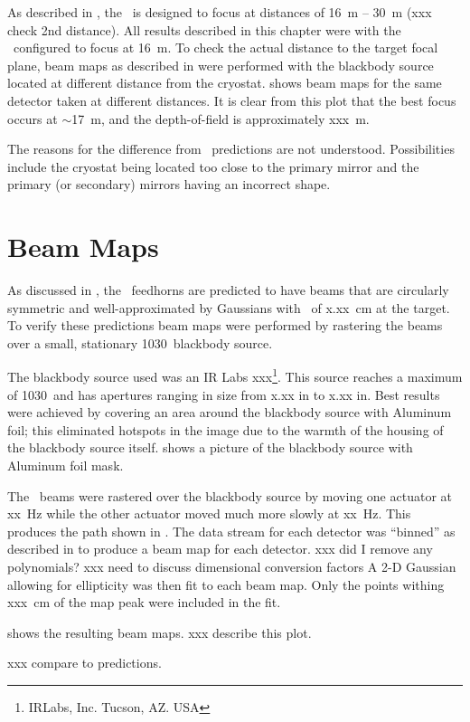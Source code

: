 As described in , the \Imager\ is designed to focus at distances of 16~m -- 30~m (xxx check 2nd distance).
All results described in this chapter were with the \Imager\ configured to focus at 16~m.
To check the actual distance to the target focal plane, beam maps as described in  were performed with the blackbody source located at different distance from the cryostat.
 shows beam maps for the same detector taken at different distances.
It is clear from this plot that the best focus occurs at $\sim$17~m, and the depth-of-field is approximately xxx~m.

The reasons for the difference from \ZEMAX\ predictions are not understood.
Possibilities include the cryostat being located too close to the primary mirror and the primary (or secondary) mirrors having an incorrect shape.

\section{Beam Maps}

As discussed in , the \Imager\ feedhorns are predicted to have beams that are circularly symmetric and well-approximated by Gaussians with \FWHM\ of x.xx~cm at the target.
To verify these predictions beam maps were performed by rastering the beams over a small, stationary 1030~\degC blackbody source.

The blackbody source used was an IR Labs xxx\footnote{IRLabs, Inc. Tucson, AZ. USA}.
This source reaches a maximum of 1030~\degC and has apertures ranging in size from x.xx in to x.xx in.
Best results were achieved by covering an area around the blackbody source with Aluminum foil; this eliminated hotspots in the image due to the warmth of the housing of the blackbody source itself.
 shows a picture of the blackbody source with Aluminum foil mask.

The \Imager\ beams were rastered over the blackbody source by moving one actuator at xx~Hz while the other actuator moved much more slowly at xx~Hz.
This produces the path shown in .
The data stream for each detector was ``binned'' as described in  to produce a beam map for each detector.
xxx did I remove any polynomials?
xxx need to discuss dimensional conversion factors
A 2-D Gaussian allowing for ellipticity was then fit to each beam map.
Only the points withing xxx~cm of the map peak were included in the fit.

 shows the resulting beam maps.
xxx describe this plot.

xxx compare to predictions.